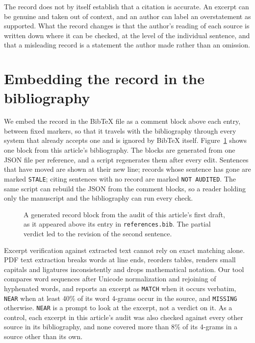 \documentclass[11pt]{article}
\begin{document}
The record does not by itself establish that a citation is accurate. An excerpt can be genuine and taken out of context, and an author can label an overstatement as supported. What the record changes is that the author's reading of each source is written down where it can be checked, at the level of the individual sentence, and that a misleading record is a statement the author made rather than an omission.

\section{Embedding the record in the bibliography}

We embed the record in the BibTeX file as a comment block above each entry, between fixed markers, so that it travels with the bibliography through every system that already accepts one and is ignored by BibTeX itself. Figure~\ref{fig:example} shows one block from this article's bibliography. The blocks are generated from one JSON file per reference, and a script regenerates them after every edit. Sentences that have moved are shown at their new line; records whose sentence has gone are marked \texttt{STALE}; citing sentences with no record are marked \texttt{NOT AUDITED}. The same script can rebuild the JSON from the comment blocks, so a reader holding only the manuscript and the bibliography can run every check.

\begin{figure}[t]
\centering
{}
\caption{A generated record block from the audit of this article's first draft, as it appeared above its entry in \texttt{references.bib}. The partial verdict led to the revision of the second sentence.}
\label{fig:example}
\end{figure}

Excerpt verification against extracted text cannot rely on exact matching alone. PDF text extraction breaks words at line ends, reorders tables, renders small capitals and ligatures inconsistently and drops mathematical notation. Our tool compares word sequences after Unicode normalization and rejoining of hyphenated words, and reports an excerpt as \texttt{MATCH} when it occurs verbatim, \texttt{NEAR} when at least 40\% of its word 4-grams occur in the source, and \texttt{MISSING} otherwise. \texttt{NEAR} is a prompt to look at the excerpt, not a verdict on it. As a control, each excerpt in this article's audit was also checked against every other source in its bibliography, and none covered more than 8\% of its 4-grams in a source other than its own.
\end{document}
